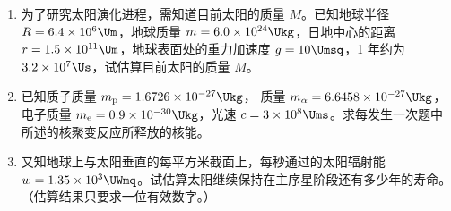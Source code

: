 \documentclass[\gkver]{gaokaozhenti}
\begin{document}
\begin{enumerate}
\begin{enumerate}
	\item
	为了研究太阳演化进程，需知道目前太阳的质量 $M$。已知地球半径 $R=6.4\times10^{6}\Um$，地球质量 $m=6.0\times10^{24}\Ukg$，日地中心的距离 $r=1.5\times10^{11}\Um$，地球表面处的重力加速度 $g=10\Umsq$，1 年约为 $3.2\times10^{7}\Us$，试估算目前太阳的质量 $M$。
	\item
	已知质子质量 $m_{\mathrm{p}}=1.6726\times10^{-27}\Ukg$， 质量 $m_{\alpha}=6.6458\times10^{-27}\Ukg$，电子质量 $m_{\mathrm{e}}=0.9\times10^{-30}\Ukg$，光速 $c=3\times10^{8}\Ums$。求每发生一次题中所述的核聚变反应所释放的核能。
	\item
	又知地球上与太阳垂直的每平方米截面上，每秒通过的太阳辐射能 $w=1.35\times10^{3}\UWmq$。试估算太阳继续保持在主序星阶段还有多少年的寿命。（估算结果只要求一位有效数字。）
\end{enumerate}

\end{enumerate}
\end{document}
